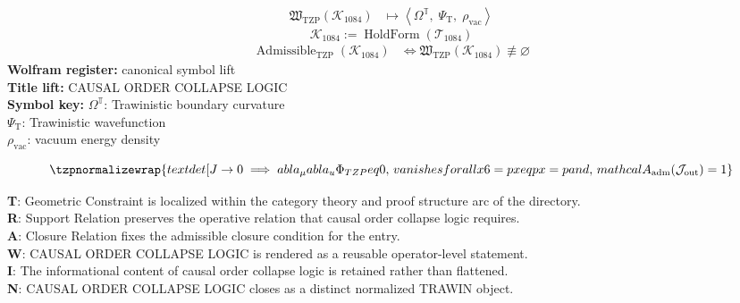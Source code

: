 \noindent
\begin{minipage}[t]{0.48\linewidth}
\begingroup
\small
\[
\begin{aligned}
\mathfrak{W}_{\mathrm{TZP}}\!\left(\mathcal{K}_{1084}\right)
&\longmapsto
\left\langle \Omega^{\mathbb{T}},\; \Psi_{\mathrm{T}},\; \rho_{\mathrm{vac}} \right\rangle
\end{aligned}
\]
\[
\mathcal{K}_{1084}
:=
\operatorname{HoldForm}\!\left(\mathcal{T}_{1084}\right)
\]
\[
\begin{aligned}
\operatorname{Admissible}_{\mathrm{TZP}}\!\left(\mathcal{K}_{1084}\right)
&\Longleftrightarrow
\mathfrak{W}_{\mathrm{TZP}}\!\left(\mathcal{K}_{1084}\right)\not\equiv\varnothing
\end{aligned}
\]
\textbf{Wolfram register:} canonical symbol lift\\
\textbf{Title lift:} CAUSAL ORDER COLLAPSE LOGIC\\
\textbf{Symbol key:} \(\Omega^{\mathbb{T}}\): Trawinistic boundary curvature\\ \(\Psi_{\mathrm{T}}\): Trawinistic wavefunction\\ \(\rho_{\mathrm{vac}}\): vacuum energy density
\par
\endgroup
\end{minipage}\hfill
\begin{minipage}[t]{0.48\linewidth}
\[
\tzpnormalizewrap{text{det}[J \to 0 \implies  abla_\mu  abla_ u \Phi_{TZP}  eq 0,\,vanishes for all x 6=px  eq px=p and,\,mathcal{A}_{\mathrm{adm}}\!\left(\mathcal{J}_{\mathrm{out}}\right)=1}
\]

\small
\textbf{T}: Geometric Constraint is localized within the category theory and proof structure arc of the directory.\\
\textbf{R}: Support Relation preserves the operative relation that causal order collapse logic requires.\\
\textbf{A}: Closure Relation fixes the admissible closure condition for the entry.\\
\textbf{W}: CAUSAL ORDER COLLAPSE LOGIC is rendered as a reusable operator-level statement.\\
\textbf{I}: The informational content of causal order collapse logic is retained rather than flattened.\\
\textbf{N}: CAUSAL ORDER COLLAPSE LOGIC closes as a distinct normalized TRAWIN object.
\normalsize
\end{minipage}


